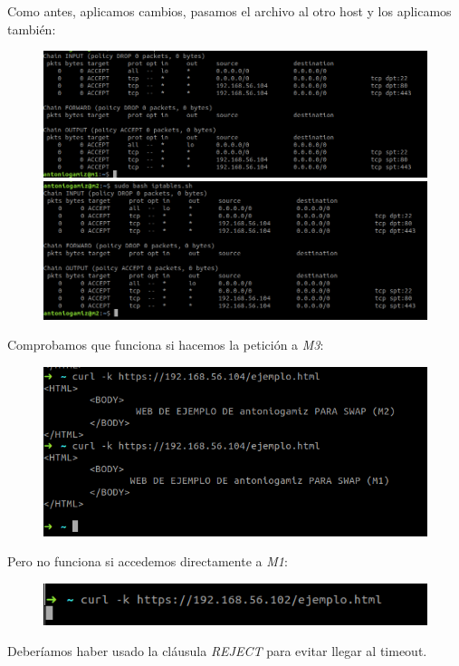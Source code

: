 \documentclass[12pt]{article}
\begin{document}
Como antes, aplicamos cambios, pasamos el archivo al otro host y los aplicamos también:

\begin{figure}[H]
\center
\includegraphics[scale=0.5]{27.png}
\includegraphics[scale=0.5]{28.png}
\end{figure}

Comprobamos que funciona si hacemos la petición a \textit{M3}:

\begin{figure}[H]
\center
\includegraphics[scale=0.5]{29.png}
\end{figure}

Pero no funciona si accedemos directamente a \textit{M1}:

\begin{figure}[H]
\center
\includegraphics[scale=0.5]{30.png}
\end{figure}

Deberíamos haber usado la cláusula \textit{REJECT} para evitar llegar al timeout.
\end{document}
